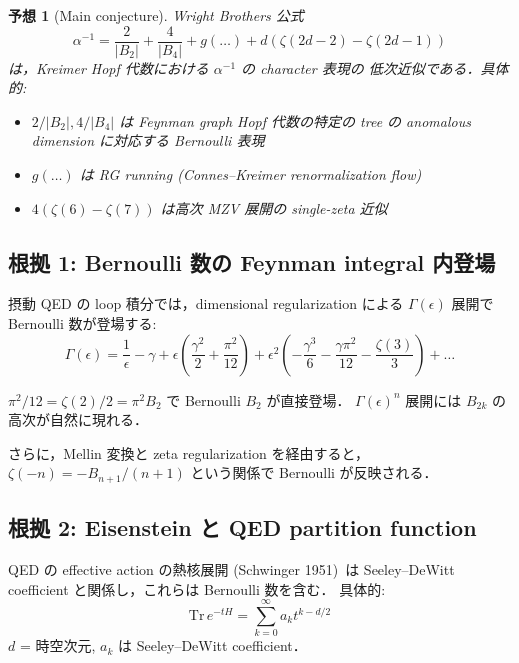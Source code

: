 \documentclass[11pt,a4paper]{article}
\newtheorem{conjecture}{予想}
\begin{document}
\begin{conjecture}[Main conjecture]
Wright Brothers 公式
\begin{equation}
\alpha^{-1} = \frac{2}{|B_2|} + \frac{4}{|B_4|} + g(\ldots) + d(\zeta(2d-2) - \zeta(2d-1))
\end{equation}
は，Kreimer Hopf 代数における $\alpha^{-1}$ の character 表現の
低次近似である．具体的:
\begin{itemize}
\item $2/|B_2|, 4/|B_4|$ は Feynman graph Hopf 代数の特定の tree の
anomalous dimension に対応する Bernoulli 表現
\item $g(\ldots)$ は RG running (Connes--Kreimer renormalization flow)
\item $4(\zeta(6) - \zeta(7))$ は高次 MZV 展開の single-zeta 近似
\end{itemize}
\end{conjecture}

\subsection{根拠 1: Bernoulli 数の Feynman integral 内登場}

摂動 QED の loop 積分では，dimensional regularization による
$\Gamma(\epsilon)$ 展開で Bernoulli 数が登場する:
\begin{equation}
\Gamma(\epsilon) = \frac{1}{\epsilon} - \gamma + \epsilon\left(\frac{\gamma^2}{2} + \frac{\pi^2}{12}\right) + \epsilon^2\left(-\frac{\gamma^3}{6} - \frac{\gamma\pi^2}{12} - \frac{\zeta(3)}{3}\right) + \ldots
\end{equation}

$\pi^2/12 = \zeta(2)/2 = \pi^2 B_2$ で Bernoulli $B_2$ が直接登場．
$\Gamma(\epsilon)^n$ 展開には $B_{2k}$ の高次が自然に現れる．

さらに，Mellin 変換と zeta regularization を経由すると，$\zeta(-n)
= -B_{n+1}/(n+1)$ という関係で Bernoulli が反映される．

\subsection{根拠 2: Eisenstein と QED partition function}

QED の effective action の熱核展開 (Schwinger 1951)~\cite{Schwinger1951}は
Seeley--DeWitt coefficient と関係し，これらは Bernoulli 数を含む．
具体的:
\begin{equation}
\text{Tr}\, e^{-t H} = \sum_{k=0}^\infty a_k t^{k-d/2}
\end{equation}
$d$ = 時空次元, $a_k$ は Seeley--DeWitt coefficient．
\end{document}
